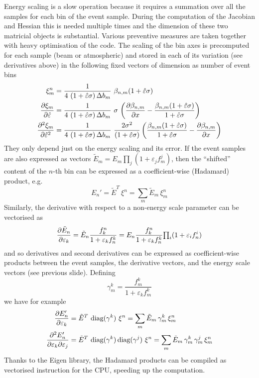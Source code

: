 \documentclass[a4paper, 11pt]{article}
\newcommand{\sk}{\hat\varepsilon}
\begin{document}
Energy scaling is a slow operation because it requires a summation over all the samples for each bin of the event sample.
During the computation of the Jacobian and Hessian this is needed multiple times and the dimension of these two matricial objects %
is substantial.
Various preventive measures are taken together with heavy optimisation of the code.
The scaling of the bin axes is precomputed for each sample (beam or atmospheric) and stored in each of its variation (see derivatives above) %
in the following fixed vectors of dimension as number of event bins
\begin{align*}
	\xi^n_m &= \frac{1}{4\ (1+\sk \sigma)\, \Delta b_m}  \ 
	\beta_{n, m}(1+\sk \sigma) \\
	\pdv{\xi_m}{\sk} &= \frac{1}{4\ (1+\sk \sigma)\, \Delta b_m}\ 
	\sigma\ \qty(\pdv{\beta_{n, m}}{x} - \frac{\beta_{n,m}(1+\sk\sigma)}{1+\sk \sigma}) \\
	\pdv[2]{\xi_m}{\sk} &= \frac{1}{4\ (1+\sk \sigma)\, \Delta b_m}\ 
	\frac{2\sigma^2}{(1+\sk \sigma)}\,\qty(\frac{\beta_{n,m}(1+\sk\sigma)}{1+\sk \sigma} - \pdv{\beta_{n, m}}{x}) \\
\end{align*}
They only depend just on the energy scaling and its error.
If the event samples are also expressed as vectors $\tilde{E}_m = E_m \prod_j (1+\varepsilon_j f^j_m)$, %
then the ``shifted'' content of the $n$-th bin can be expressed as a coefficient-wise (Hadamard) product, e.g.\ 
\begin{equation}
	E_n' = \tilde{E}^T\ \xi^n = \sum_m \tilde{E}_m\, \xi^n_m
\end{equation}
Similarly, the derivative with respect to a non-energy scale parameter can be vectorised as
\begin{equation}
	\pdv{\tilde{E}_n}{\varepsilon_k} = \tilde{E}_n \frac{f_k^n}{1 + \varepsilon_k f_n^k} =
	E_n \frac{f_k^n}{1 + \varepsilon_k f_n^k}{\textstyle\prod_i} (1 + \varepsilon_i f_n^i) 
\end{equation}
and so derivatives and second derivatives can be expressed as coefficient-wise products between %
the event samples, the derivative vectors, and the energy scale vectors (see previous slide).
Defining
\[
	\gamma^k_m = \frac{f_m^k}{1+\varepsilon_k f_m^k}
\]
we have for example
\begin{align}
	\pdv{E_n'}{\varepsilon_k} &= \tilde{E}^T\ \text{diag}(\gamma^k)\ \xi^n %
	= \sum_m \tilde{E}_m\, \gamma^k_m\, \xi^n_m \\
	\pdv{E_n'}{\varepsilon_k}{\varepsilon_j} &=
	\tilde{E}^T\ \text{diag}(\gamma^k)\, \text{diag}(\gamma^j)\ \xi^n
	= \sum_m \tilde{E}_m\, \gamma^k_m\, \gamma^j_m\, \xi^n_m \\
\end{align}
Thanks to the Eigen library, the Hadamard products can be compiled as vectorised instruction for the CPU, %
speeding up the computation.
\end{document}
